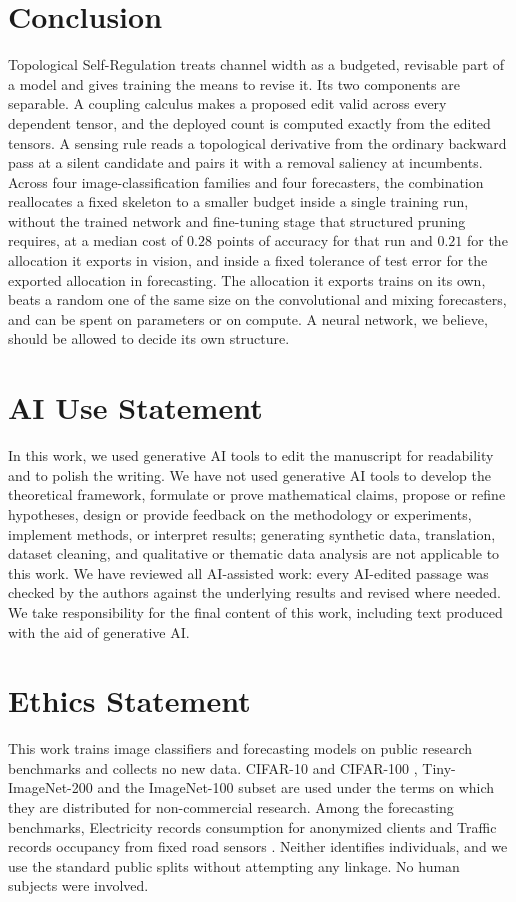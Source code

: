 \documentclass[10pt]{article}
\theoremstyle{paper}
\begin{document}
\section{Conclusion}
\label{sec:conclusion}
Topological Self-Regulation treats channel width as a budgeted, revisable part of a model and gives training the means to revise it. Its two components are separable. A coupling calculus makes a proposed edit valid across every dependent tensor, and the deployed count is computed exactly from the edited tensors. A sensing rule reads a topological derivative from the ordinary backward pass at a silent candidate and pairs it with a removal saliency at incumbents. Across four image-classification families and four forecasters, the combination reallocates a fixed skeleton to a smaller budget inside a single training run, without the trained network and fine-tuning stage that structured pruning requires, at a median cost of $0.28$ points of accuracy for that run and $0.21$ for the allocation it exports in vision, and inside a fixed tolerance of test error for the exported allocation in forecasting. The allocation it exports trains on its own, beats a random one of the same size on the convolutional and mixing forecasters, and can be spent on parameters or on compute. A neural network, we believe, should be allowed to decide its own structure.

\label{main:end}

\section*{AI Use Statement}
In this work, we used generative AI tools to edit the manuscript for readability and to polish the writing. We have not used generative AI tools to develop the theoretical framework, formulate or prove mathematical claims, propose or refine hypotheses, design or provide feedback on the methodology or experiments, implement methods, or interpret results; generating synthetic data, translation, dataset cleaning, and qualitative or thematic data analysis are not applicable to this work. We have reviewed all AI-assisted work: every AI-edited passage was checked by the authors against the underlying results and revised where needed. We take responsibility for the final content of this work, including text produced with the aid of generative AI.

\section*{Ethics Statement}
This work trains image classifiers and forecasting models on public research benchmarks and
collects no new data. CIFAR-10 and CIFAR-100 \citep{krizhevsky2009learning}, Tiny-ImageNet-200
\citep{le2015tiny} and the ImageNet-100 subset \citep{5206848} are used under the terms
on which they are distributed for non-commercial research. Among the forecasting benchmarks,
Electricity records consumption for anonymized clients and Traffic records occupancy from fixed
road sensors \citep{lai2018modeling,zhou2021informer}. Neither identifies individuals, and we use the
standard public splits without attempting any linkage. No human subjects were involved.
\end{document}
